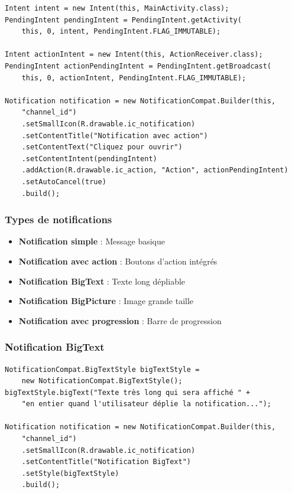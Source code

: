 \documentclass[11pt,a4paper]{article}
\begin{document}
\begin{lstlisting}
Intent intent = new Intent(this, MainActivity.class);
PendingIntent pendingIntent = PendingIntent.getActivity(
    this, 0, intent, PendingIntent.FLAG_IMMUTABLE);

Intent actionIntent = new Intent(this, ActionReceiver.class);
PendingIntent actionPendingIntent = PendingIntent.getBroadcast(
    this, 0, actionIntent, PendingIntent.FLAG_IMMUTABLE);

Notification notification = new NotificationCompat.Builder(this, 
    "channel_id")
    .setSmallIcon(R.drawable.ic_notification)
    .setContentTitle("Notification avec action")
    .setContentText("Cliquez pour ouvrir")
    .setContentIntent(pendingIntent)
    .addAction(R.drawable.ic_action, "Action", actionPendingIntent)
    .setAutoCancel(true)
    .build();
\end{lstlisting}

\subsubsection{Types de notifications}

\begin{itemize}
    \item \textbf{Notification simple} : Message basique
    \item \textbf{Notification avec action} : Boutons d'action intégrés
    \item \textbf{Notification BigText} : Texte long dépliable
    \item \textbf{Notification BigPicture} : Image grande taille
    \item \textbf{Notification avec progression} : Barre de progression
\end{itemize}

\subsubsection{Notification BigText}

\begin{lstlisting}
NotificationCompat.BigTextStyle bigTextStyle = 
    new NotificationCompat.BigTextStyle();
bigTextStyle.bigText("Texte très long qui sera affiché " +
    "en entier quand l'utilisateur déplie la notification...");

Notification notification = new NotificationCompat.Builder(this, 
    "channel_id")
    .setSmallIcon(R.drawable.ic_notification)
    .setContentTitle("Notification BigText")
    .setStyle(bigTextStyle)
    .build();
\end{lstlisting}
\end{document}
